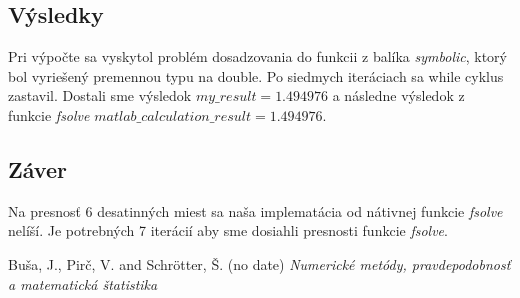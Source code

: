 \documentclass{article}
\theoremstyle{definition}
\theoremstyle{remark}
\begin{document}
\subsection{Výsledky}\label{sec:nothing}
Pri výpočte sa vyskytol problém dosadzovania do funkcii z balíka \emph{symbolic}, ktorý bol vyriešený premennou typu na double. Po siedmych iteráciach sa while cyklus zastavil. Dostali sme výsledok $my\_result = 1.494976$ a následne výsledok z funkcie \emph{fsolve} $matlab\_calculation\_result = 1.494976$.



\subsection{Záver}\label{sec:nothing}
Na presnosť 6 desatinných miest sa naša implematácia od nátivnej funkcie \emph{fsolve} nelíší. Je potrebných 7 iterácií aby sme dosiahli presnosti funkcie \emph{fsolve}.
\begin{thebibliography}{99}
 Buša, J., Pirč, V. and Schrötter, Š. (no date) \emph{Numerické metódy, pravdepodobnosť a matematická štatistika}
\end{thebibliography}
\end{document}
